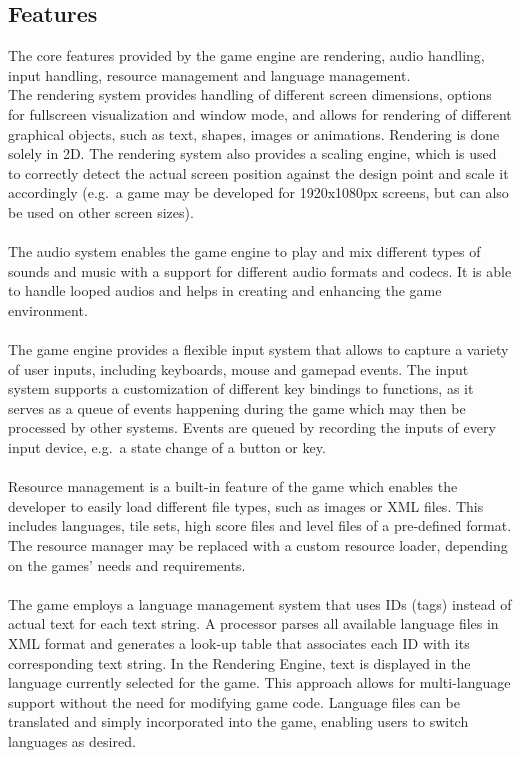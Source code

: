 \subsection{Features}\label{subsec:features}
The core features provided by the game engine are rendering, audio handling, input handling, resource management and language management.
\\
The rendering system provides handling of different screen dimensions, options for fullscreen visualization and window mode, and allows
for rendering of different graphical objects, such as text, shapes, images or animations.
Rendering is done solely in 2D.
The rendering system also provides a scaling engine, which is used to correctly detect the actual screen position against the design point and scale it accordingly
(e.g.\ a game may be developed for 1920x1080px screens, but can also be used on other screen sizes).
\\
\\
The audio system enables the game engine to play and mix different types of sounds and music with a support for different audio formats and codecs.
It is able to handle looped audios and helps in creating and enhancing the game environment.
\\
\\
The game engine provides a flexible input system that allows to capture a variety of user inputs, including keyboards, mouse and gamepad events.
The input system supports a customization of different key bindings to functions, as it serves as a queue of events happening during the game which
may then be processed by other systems.
Events are queued by recording the inputs of every input device, e.g.\ a state change of a button or key.
\\
\\
Resource management is a built-in feature of the game which enables the developer to easily load different file types, such as images or XML files.
This includes languages, tile sets, high score files and level files of a pre-defined format.
The resource manager may be replaced with a custom resource loader, depending on the games' needs and requirements.
\\
\\
The game employs a language management system that uses IDs (tags) instead of actual text for each text string.
A processor parses all available language files in XML format and generates a look-up table that associates each ID with its corresponding text string.
In the Rendering Engine, text is displayed in the language currently selected for the game.
This approach allows for multi-language support without the need for modifying game code.
Language files can be translated and simply incorporated into the game, enabling users to switch languages as desired.
